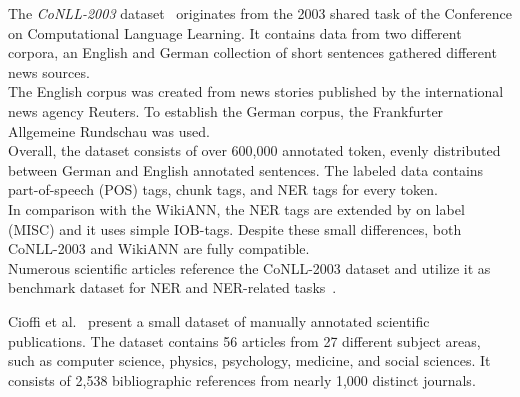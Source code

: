 The \textit{CoNLL-2003} dataset~\cite{conll2003} originates from the 2003 shared task of the Conference on Computational Language Learning. It contains data from two different corpora, an English and German collection of short sentences gathered different news sources.\\
The English corpus was created from news stories published by the international news agency Reuters. To establish the German corpus, the Frankfurter Allgemeine Rundschau was used.\\
Overall, the dataset consists of over 600,000 annotated token, evenly distributed between German and English annotated sentences. The labeled data contains part-of-speech (POS) tags, chunk tags, and NER tags for every token.\\
In comparison with the WikiANN, the NER tags are extended by on label (MISC) and it uses simple IOB-tags. Despite these small differences, both CoNLL-2003 and WikiANN are fully compatible.\\
Numerous scientific articles reference the CoNLL-2003 dataset and utilize it as benchmark dataset for NER and NER-related tasks~\cite{ner_survey}.\par
Cioffi et al.~\cite{cioffi2022structured} present a small dataset of manually annotated scientific publications. The dataset contains 56 articles from 27 different subject areas, such as computer science, physics, psychology, medicine, and social sciences. It consists of 2,538 bibliographic references from nearly 1,000 distinct journals.
